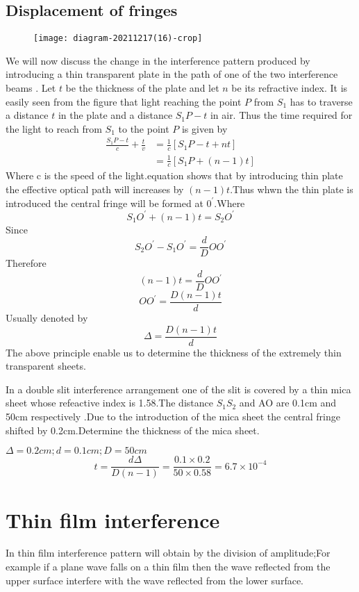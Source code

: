 \subsection{Displacement of fringes}
\begin{figure}[H]
	\centering
	\texttt{[image: diagram-20211217(16)-crop]}
	\caption{}
	\label{}
\end{figure}
We will now discuss the change in the interference pattern produced by introducing a thin transparent plate in the path of one of the two interference beams . Let $t$ be the thickness of the plate and let $n$ be its refractive index. It is easily seen from the figure that light reaching the point $P$ from $S_{1}$ has to traverse a distance $t$ in the plate and a distance $S_{1} P-t$ in air. Thus the time required for the light to reach from $S_{1}$ to the point $P$ is given by\\
$$\begin{aligned}
\frac{S_{1} P-t}{c}+\frac{t}{v} &=\frac{1}{c}\left[S_{1} P-t+n t\right] \\
&=\frac{1}{c}\left[S_{1} P+(n-1) t\right]
\end{aligned}$$
Where c is the speed of the light.equation shows that by introducing thin plate the effective optical path will increases by $(n-1)t$.Thus whwn the thin plate is introduced the central fringe will be formed at $0^{\prime}$.Where\\
$$S_{1} O^{\prime}+(n-1) t=S_{2} O^{\prime}$$
Since $$S_2O^{\prime}-S_1O^{\prime}=\frac{d}{D}OO^{\prime}$$
Therefore \\
$$(n-1)t=\frac{d}{D}OO^{\prime}$$
$$OO^{\prime}=\frac{D(n-1)t}{d}$$
Usually denoted by\\
$$\Delta=\frac{D(n-1)t}{d}$$
The above principle enable us to determine the thickness of the extremely thin transparent sheets.
\begin{exercise}
	In a double slit interference arrangement one of the slit is covered by a thin mica sheet whose refeactive index is 1.58.The distance $S_1S_2$ and AO are 0.1cm and 50cm respectively .Due to the introduction of the mica sheet the central fringe shifted by 0.2cm.Determine the thickness of the mica sheet.
\end{exercise}
\begin{answer}
$\Delta=0.2cm;d=0.1cm;D=50cm$\\
$$t=\frac{d\Delta }{D(n-1)}=\frac{0.1\times 0.2}{50\times 0.58}=6.7\times 10^{-4}$$
\end{answer}
\section{Thin film interference}
In thin film interference pattern will obtain by the division of amplitude;For example if a plane wave falls on a thin film then the wave reflected from the upper surface interfere with the wave reflected from the lower surface.
